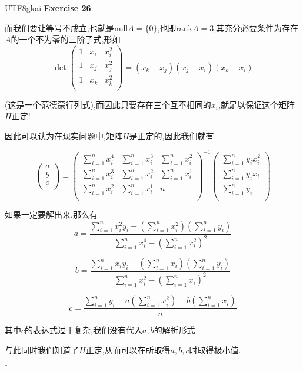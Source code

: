 \documentclass[11pt,hyperref,a4paper,UTF8]{ctexart}
\newenvironment{exercise}[1]{%
{\textbf{Exercise #1} \\ 
    }
}{
  \hfill $\square$ 
  \par\bigskip 
}
\newcommand{\rank}{\text{rank}}
\newcommand{\n}{\text{null}}
\begin{document}
\begin{CJK}{UTF8}{gkai}
\begin{exercise}{26}
    而我们要让等号不成立,也就是$\n A = \{0\}$,也即$\rank A = 3$,其充分必要条件为存在$A$的一个不为零的三阶子式,形如
    \[\det\begin{pmatrix}
        1&x_i&x_i^2\\
        1&x_j&x_j^2\\
        1&x_k&x_k^2\\
    \end{pmatrix} = (x_k - x_j)(x_j - x_i)(x_k - x_i)\]
    
    (这是一个范德蒙行列式),而因此只要存在三个互不相同的$x_i$,就足以保证这个矩阵$H$正定!
    
    因此可以认为在现实问题中,矩阵$H$是正定的,因此我们就有:
    
    \[\begin{pmatrix}
        a\\
        b\\
        c\\
    \end{pmatrix}
    =\begin{pmatrix}
        \sum_{i = 1}^{n}x_i^4&\sum_{i = 1}^{n}x_i^3&\sum_{i = 1}^{n}x_i^2\\
        \sum_{i = 1}^{n}x_i^3&\sum_{i = 1}^{n}x_i^2&\sum_{i = 1}^{n}x_i^1\\
        \sum_{i = 1}^{n}x_i^2&\sum_{i = 1}^{n}x_i^1&n\\
    \end{pmatrix}^{-1}
    \begin{pmatrix}
        \sum_{i = 1}^{n}y_i x_i^2\\
        \sum_{i = 1}^{n}y_i x_i\\
        \sum_{i = 1}^{n}y_i \\
    \end{pmatrix}
    \]

    如果一定要解出来,那么有
     \[
     a = \frac{\sum_{i=1}^{n} x_i^2 y_i - (\sum_{i=1}^{n} x_i^2)(\sum_{i=1}^{n} y_i)}{\sum_{i=1}^{n} x_i^4 - (\sum_{i=1}^{n} x_i^2)^2}
     \]


     \[
     b = \frac{\sum_{i=1}^{n} x_i y_i - (\sum_{i=1}^{n} x_i)(\sum_{i=1}^{n} y_i)}{\sum_{i=1}^{n} x_i^2 - (\sum_{i=1}^{n} x_i)^2}
     \]

     \[
     c = \frac{\sum_{i=1}^{n} y_i - a(\sum_{i=1}^{n} x_i^2) - b(\sum_{i=1}^{n} x_i)}{n}
     \]

     其中$c$的表达式过于复杂,我们没有代入$a,b$的解析形式

    与此同时我们知道了$H$正定,从而可以在所取得$a,b,c$时取得极小值.
\end{exercise}


\end{CJK}
\end{document}
